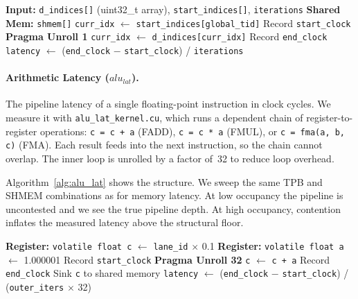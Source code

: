 \begin{algorithm}[t]
\caption{Memory Latency Microkernel}
\label{alg:mem_lat}
\begin{algorithmic}[1]
\STATE \textbf{Input:} \texttt{d\_indices[]} (uint32\_t array), \texttt{start\_indices[]}, \texttt{iterations}
\STATE \textbf{Shared Mem:} \texttt{shmem[]} 
\STATE \texttt{curr\_idx} $\leftarrow$ \texttt{start\_indices[global\_tid]}
\STATE Record \texttt{start\_clock}
\STATE \textbf{Pragma Unroll 1} 
    \STATE \texttt{curr\_idx} $\leftarrow$ \texttt{d\_indices[curr\_idx]} 
\ENDFOR
\STATE Record \texttt{end\_clock}
\STATE \texttt{latency} $\leftarrow$ (\texttt{end\_clock} $-$ \texttt{start\_clock}) / \texttt{iterations}
\end{algorithmic}
\end{algorithm}


\paragraph{Arithmetic Latency ($alu_{lat}$).}
The pipeline latency of a single floating-point instruction in clock cycles.
We measure it with \texttt{alu\_lat\_kernel.cu}, which runs a dependent chain
of register-to-register operations: \texttt{c = c + a} (FADD),
\texttt{c = c * a} (FMUL), or \texttt{c = fma(a, b, c)} (FMA).
Each result feeds into the next instruction, so the chain cannot overlap.
The inner loop is unrolled by a factor of~32 to reduce loop overhead.

Algorithm~\ref{alg:alu_lat} shows the structure.
We sweep the same TPB and SHMEM combinations as for memory latency.
At low occupancy the pipeline is uncontested and we see the true pipeline depth.
At high occupancy, contention inflates the measured latency above the structural
floor.

\begin{algorithm}[t]
\caption{Arithmetic Latency Microkernel (FADD / FMUL / FMA)}
\label{alg:alu_lat}
\begin{algorithmic}[1]
\STATE \textbf{Register:} \texttt{volatile float c} $\leftarrow$ \texttt{lane\_id} $\times$ 0.1
\STATE \textbf{Register:} \texttt{volatile float a} $\leftarrow$ 1.000001
\STATE Record \texttt{start\_clock}
    \STATE \textbf{Pragma Unroll 32}
        \STATE \texttt{c} $\leftarrow$ \texttt{c + a} 
    \ENDFOR
\ENDFOR
\STATE Record \texttt{end\_clock}
\STATE Sink \texttt{c} to shared memory 
\STATE \texttt{latency} $\leftarrow$ (\texttt{end\_clock} $-$ \texttt{start\_clock}) / (\texttt{outer\_iters} $\times$ 32)
\end{algorithmic}
\end{algorithm}


